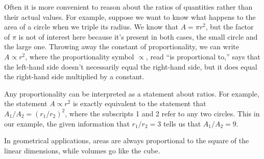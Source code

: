 Often it is more convenient to reason about the ratios of quantities rather
than their actual values. For example, suppose we want to know what happens
to the area of a circle when we triple its radius. We know that $A=\pi r^2$,
but the factor of $\pi$ is not of interest here because it's present in
both cases, the small circle and the large one. Throwing away the constant
of proportionality, we can write $A\propto r^2$, where the proportionality
symbol $\propto$, read ``is proportional to,'' says that the left-hand side
doesn't necessarily equal the right-hand side, but it does equal the right-hand
side multiplied by a constant.

Any proportionality can be interpreted as a statement about ratios. For example,
the statement $A\propto r^2$ is exactly equivalent to the statement that
$A_1/A_2=(r_1/r_2)^2$, where the subscripts 1 and 2 refer to any two circles.
This in our example, the given information that $r_1/r_2=3$ tells us that
$A_1/A_2=9$.

In geometrical applications, areas are always proportional to the square of
the linear dimensions, while volumes go like the cube.
